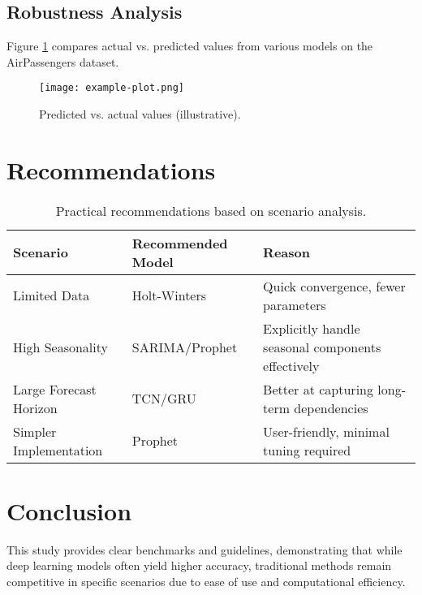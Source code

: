 \documentclass{article}
\begin{document}
\subsection{Robustness Analysis}
Figure \ref{fig:predictions} compares actual vs. predicted values from various models on the AirPassengers dataset.

\begin{figure}[h]
    \centering
    \texttt{[image: example-plot.png]}
    \caption{Predicted vs. actual values (illustrative).}
    \label{fig:predictions}
\end{figure}

\section{Recommendations}
\begin{table}[h]
    \centering
    \begin{tabular}{llp{6cm}}
    \toprule
        Scenario & Recommended Model & Reason \\
    \midrule
        Limited Data & Holt-Winters & Quick convergence, fewer parameters \\
        High Seasonality & SARIMA/Prophet & Explicitly handle seasonal components effectively \\
        Large Forecast Horizon & TCN/GRU & Better at capturing long-term dependencies \\
        Simpler Implementation & Prophet & User-friendly, minimal tuning required \\
    \bottomrule
    \end{tabular}
    \caption{Practical recommendations based on scenario analysis.}
\end{table}

\section{Conclusion}
This study provides clear benchmarks and guidelines, demonstrating that while deep learning models often yield higher accuracy, traditional methods remain competitive in specific scenarios due to ease of use and computational efficiency.



\end{document}
